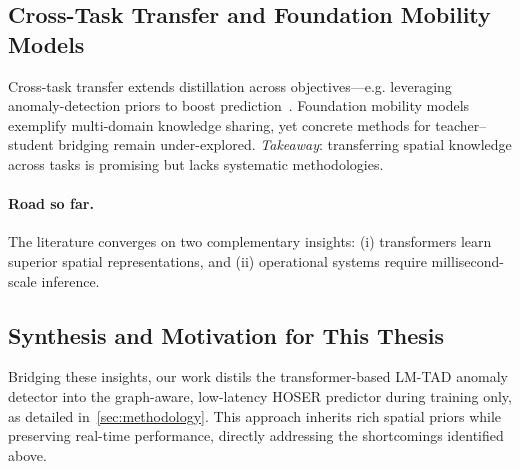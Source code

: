 \subsection{Cross-Task Transfer and Foundation Mobility Models}
\label{sec:lit-transfer}
Cross-task transfer extends distillation across objectives—e.g.
leveraging anomaly-detection priors to boost prediction~\cite{maLearningUniversalHuman2025}.  Foundation mobility models exemplify multi-domain knowledge sharing, yet concrete methods for teacher–student bridging remain under-explored.  \textit{Takeaway}: transferring spatial knowledge across tasks is promising but lacks systematic methodologies.

\paragraph{Road so far.}  The literature converges on two complementary insights: (i) transformers learn superior spatial representations, and (ii) operational systems require millisecond-scale inference.

\subsection*{Synthesis and Motivation for This Thesis}
\label{sec:lit-synthesis}
Bridging these insights, our work distils the transformer-based LM-TAD anomaly detector into the graph-aware, low-latency HOSER predictor during training only, as detailed in~\autoref{sec:methodology}. This approach inherits rich spatial priors while preserving real-time performance, directly addressing the shortcomings identified above.

